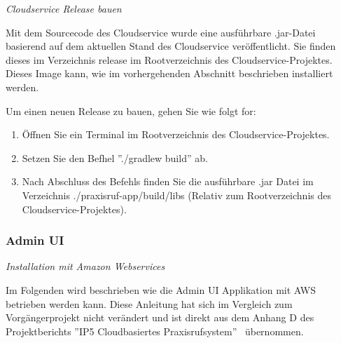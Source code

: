 \textit{Cloudservice Release bauen}

Mit dem Sourcecode des Cloudservice wurde eine ausführbare .jar-Datei basierend auf dem aktuellen Stand des Cloudservice veröffentlicht.
Sie finden dieses im Verzeichnis release im Rootverzeichnis des Cloudservice-Projektes.
Dieses Image kann, wie im vorhergehenden Abschnitt beschrieben installiert werden.

Um einen neuen Release zu bauen, gehen Sie wie folgt for:

\begin{enumerate}
    \item Öffnen Sie ein Terminal im Rootverzeichnis des Cloudservice-Projektes.
    \item Setzen Sie den Befhel ''./gradlew build'' ab.
    \item Nach Abschluss des Befehls finden Sie die ausführbare .jar Datei im Verzeichnis ./praxisruf-app/build/libs
    (Relativ zum Rootverzeichnis des Cloudservice-Projektes).
\end{enumerate}

\clearpage

\subsubsection*{Admin UI}

\textit{Installation mit Amazon Webservices}

Im Folgenden wird beschrieben wie die Admin UI Applikation mit AWS betrieben werden kann.
Diese Anleitung hat sich im Vergleich zum Vorgängerprojekt nicht verändert und ist direkt aus dem Anhang D des Projektberichts ''IP5 Cloudbasiertes Praxisrufsystem''~\cite{ip5} übernommen.

